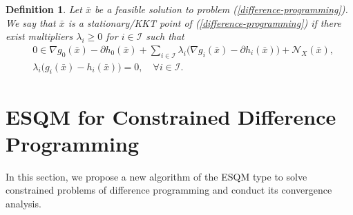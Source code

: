 \documentclass[11pt,a4paper]{article}
\newtheorem{definition}[theorem]{Definition}
\theoremstyle{plain}
\begin{document}

\begin{definition}\label{def:critical-point}
Let $\bar{x}$ be a feasible solution to problem (\ref{difference-programming}). We say that $\bar{x}$ is a {\em stationary/KKT point} of (\ref{difference-programming}) if there exist multipliers $\lambda_i \geq 0$ for $i\in\mathcal{I}$ such that
\begin{equation}\label{kkt}
\begin{aligned}
&0 \in \nabla g_0(\bar{x}) - \partial h_0(\bar{x}) + \sum_{i\in\mathcal{I}} \lambda_i \big( \nabla g_i(\bar{x}) - \partial h_i(\bar{x}) \big) + \mathcal N_X(\bar{x}), \\
&\lambda_i \big( g_i(\bar{x}) - h_i(\bar{x}) \big) = 0, \quad  \forall i\in\mathcal{I}.
\end{aligned}
\end{equation}
\end{definition}



\section{ESQM for Constrained Difference Programming}\label{sec:alg}
\setcounter{equation}{0}
In this section, we propose a new algorithm of the ESQM type to solve constrained problems of difference programming  and conduct its convergence analysis. \vspace*{0.05in}
\end{document}
